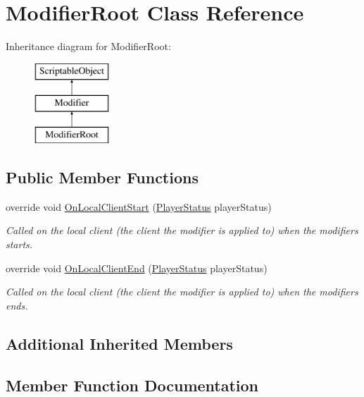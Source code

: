 \hypertarget{class_modifier_root}{}\section{Modifier\+Root Class Reference}
\label{class_modifier_root}
Inheritance diagram for Modifier\+Root\+:\begin{figure}[H]
\begin{center}
\leavevmode
\includegraphics[height=3.000000cm]{class_modifier_root}
\end{center}
\end{figure}
\subsection*{Public Member Functions}
\begin{DoxyCompactItemize}
\item 
override void \hyperlink{class_modifier_root_a4905c6533e50d82cb9ffad1eda6c076e}{On\+Local\+Client\+Start} (\hyperlink{class_player_status}{Player\+Status} player\+Status)
\begin{DoxyCompactList}\small\item\em Called on the local client (the client the modifier is applied to) when the modifiers starts. \end{DoxyCompactList}\item 
override void \hyperlink{class_modifier_root_a2310d2c479ff8a6a8d371b931c7a03ce}{On\+Local\+Client\+End} (\hyperlink{class_player_status}{Player\+Status} player\+Status)
\begin{DoxyCompactList}\small\item\em Called on the local client (the client the modifier is applied to) when the modifiers ends. \end{DoxyCompactList}\end{DoxyCompactItemize}
\subsection*{Additional Inherited Members}


\subsection{Member Function Documentation}
\hypertarget{class_modifier_root_a2310d2c479ff8a6a8d371b931c7a03ce}{}\label{class_modifier_root_a2310d2c479ff8a6a8d371b931c7a03ce} 
